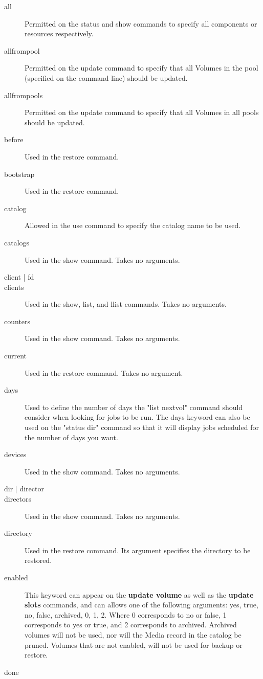 \begin{description}
\item [all]
  Permitted on the status and show commands to specify all components or
  resources respectively.
\item [allfrompool]
  Permitted on the update command to specify that all Volumes in the
  pool (specified on the command line) should be updated.
\item [allfrompools]
  Permitted on the update command to specify that all Volumes in all
  pools should be updated.
\item [before]
  Used in the restore command.
\item [bootstrap]
  Used in the restore command.
\item [catalog]
  Allowed in the use command to specify the catalog name
  to be used.
\item [catalogs]
  Used in the show command. Takes no arguments.
\item [client | fd]
\item [clients]
  Used in the show, list, and llist commands. Takes no arguments.
\item [counters]
  Used in the show command. Takes no arguments.
\item [current]
  Used in the restore command. Takes no argument.
\item [days]
  Used to define the number of days the "list nextvol" command
  should consider when looking for jobs to be run.  The days keyword
  can also be used on the "status dir" command so that it will display
  jobs scheduled for the number of days you want.
\item [devices]
  Used in the show command. Takes no arguments.
\item [dir | director]
\item [directors]
  Used in the show command. Takes no arguments.
\item [directory]
  Used in the restore command. Its argument specifies the directory
  to be restored.
\item [enabled]
  This keyword can appear on the {\bf update volume} as well
  as the {\bf update slots} commands, and can
  allows one of the following arguments: yes, true, no, false, archived,
  0, 1, 2.  Where 0 corresponds to no or false, 1 corresponds to yes or true, and
  2 corresponds to archived.  Archived volumes will not be used, nor will
  the Media record in the catalog be pruned. Volumes that are not enabled,
  will not be used for backup or restore.
\item [done]

\end{description}
